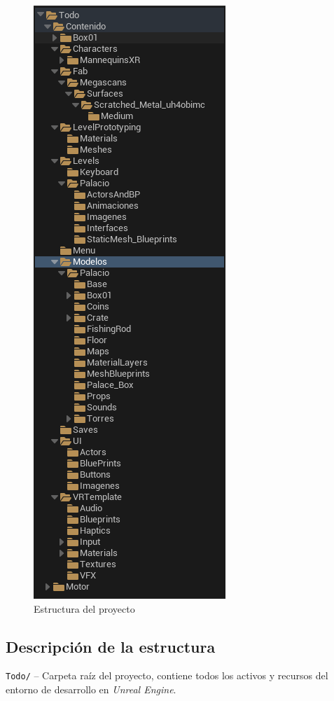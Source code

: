 \begin{figure}[H]
    \centering
    \includegraphics[scale=0.4]{../img/anexos/estructura_del_proyecto.png}
    \caption[ Estructura del proyecto]{Estructura del proyecto}
    \label{fig:estructura_del_proyecto}
\end{figure}

\subsection{Descripción de la estructura}

\texttt{Todo/} – Carpeta raíz del proyecto, contiene todos los activos y recursos del entorno de desarrollo en \textit{Unreal Engine}.

